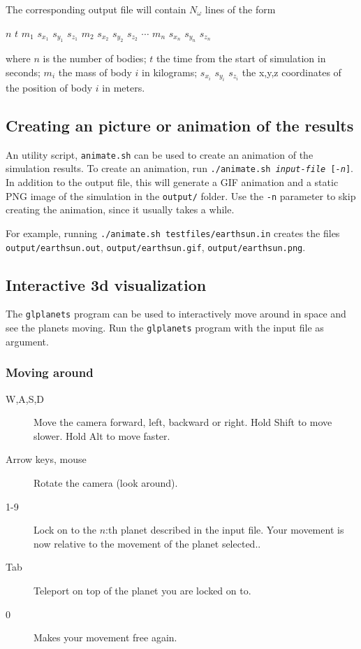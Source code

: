 \documentclass[a4paper]{article}
\begin{document}
   The corresponding output file will contain $N_\omega$ lines of the form
   \begin{center} $n$ $t$ $m_1$ $s_{x_1}$ $s_{y_1}$ $s_{z_1}$ $m_2$ $s_{x_2}$ $s_{y_2}$ $s_{z_2}$ $\cdots$ $m_n$ $s_{x_n}$ $s_{y_n}$ $s_{z_n}$\end{center}
   where $n$ is the number of bodies; $t$ the time from the start of simulation in seconds; $m_i$ the mass of body $i$ in kilograms;
   $s_{x_i}$ $s_{y_i}$ $s_{z_i}$ the x,y,z coordinates of the position of body $i$ in meters.
   \subsection{Creating an picture or animation of the results}
   An utility script, \texttt{animate.sh} can be used to create an animation of the simulation results.
   To create an animation, run \texttt{./animate.sh \emph{input-file} [\emph{-n}]}.
   In addition to the output file, this will generate a GIF animation and a static PNG image of the simulation in the \texttt{output/} folder.
   Use the \texttt{-n} parameter to skip creating the animation, since it usually takes a while.

   For example, running \texttt{./animate.sh testfiles/earthsun.in} creates the files \texttt{output/earthsun.out},
   \texttt{output/earthsun.gif}, \texttt{output/earthsun.png}.
   \subsection{Interactive 3d visualization}
   The \texttt{glplanets} program can be used to interactively move around in space and see the planets moving.
   Run the \texttt{glplanets} program with the input file as argument.
   \subsubsection{Moving around}
   \begin{description}
   \item[W,A,S,D] Move the camera forward, left, backward or right. Hold Shift to move slower. Hold Alt to move faster.
   \item[Arrow keys, mouse] Rotate the camera (look around).
   \item[1-9] Lock on to the $n$:th planet described in the input file. Your movement is now relative to the movement of the planet selected..
   \item[Tab] Teleport on top of the planet you are locked on to.
   \item[0] Makes your movement free again.
   \end{description}
\end{document}
